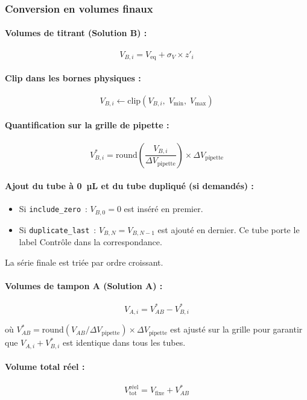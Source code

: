 \documentclass[12pt, a4paper]{article}
\begin{document}
\subsubsection{Conversion en volumes finaux}

\paragraph{Volumes de titrant (Solution B) :}
\[
V_{B,i} = V_\text{eq} + \sigma_V \times z'_i
\]

\paragraph{Clip dans les bornes physiques :}
\[
V_{B,i} \leftarrow \text{clip}(V_{B,i},\; V_\text{min},\; V_\text{max})
\]

\paragraph{Quantification sur la grille de pipette :}
\[
V_{B,i}^* = \text{round}\!\left(\frac{V_{B,i}}{\Delta V_\text{pipette}}\right)
             \times \Delta V_\text{pipette}
\]

\paragraph{Ajout du tube à 0~µL et du tube dupliqué (si demandés) :}
\begin{itemize}
  \item Si \texttt{include\_zero}~: $V_{B,0} = 0$ est inséré en premier.
  \item Si \texttt{duplicate\_last}~: $V_{B,N} = V_{B,N-1}$ est ajouté en
        dernier. Ce tube porte le label \og Contrôle\fg{} dans la correspondance.
\end{itemize}

La série finale est triée par ordre croissant.

\paragraph{Volumes de tampon A (Solution A) :}
\[
V_{A,i} = V_{AB}^* - V_{B,i}^*
\]

où $V_{AB}^* = \text{round}(V_{AB} / \Delta V_\text{pipette}) \times
\Delta V_\text{pipette}$ est ajusté sur la grille pour garantir que
$V_{A,i} + V_{B,i}^*$ est identique dans tous les tubes.

\paragraph{Volume total réel :}
\[
V_\text{tot}^\text{réel} = V_\text{fixe} + V_{AB}^*
\]
\end{document}
